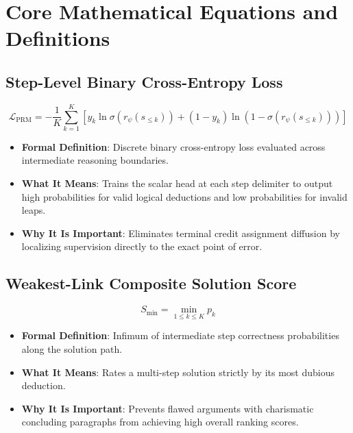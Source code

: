 \documentclass[11pt,a4paper]{article}
\theoremstyle{definition}
\begin{document}
\section{Core Mathematical Equations and Definitions}

\subsection{Step-Level Binary Cross-Entropy Loss}
{\boldmath
\begin{equation}
\mathcal{L}_{\text{PRM}} = - \frac{1}{K}\sum_{k=1}^K \left[ y_k \ln \sigma(r_\psi(s_{\le k})) + (1 - y_k) \ln(1 - \sigma(r_\psi(s_{\le k}))) \right]
\end{equation}
}
\begin{itemize}
    \item \textbf{Formal Definition}: Discrete binary cross-entropy loss evaluated across intermediate reasoning boundaries.
    \item \textbf{What It Means}: Trains the scalar head at each step delimiter to output high probabilities for valid logical deductions and low probabilities for invalid leaps.
    \item \textbf{Why It Is Important}: Eliminates terminal credit assignment diffusion by localizing supervision directly to the exact point of error.
\end{itemize}

\subsection{Weakest-Link Composite Solution Score}
{\boldmath
\begin{equation}
S_{\min} = \min_{1 \le k \le K} p_k
\end{equation}
}
\begin{itemize}
    \item \textbf{Formal Definition}: Infimum of intermediate step correctness probabilities along the solution path.
    \item \textbf{What It Means}: Rates a multi-step solution strictly by its most dubious deduction.
    \item \textbf{Why It Is Important}: Prevents flawed arguments with charismatic concluding paragraphs from achieving high overall ranking scores.
\end{itemize}
\end{document}
